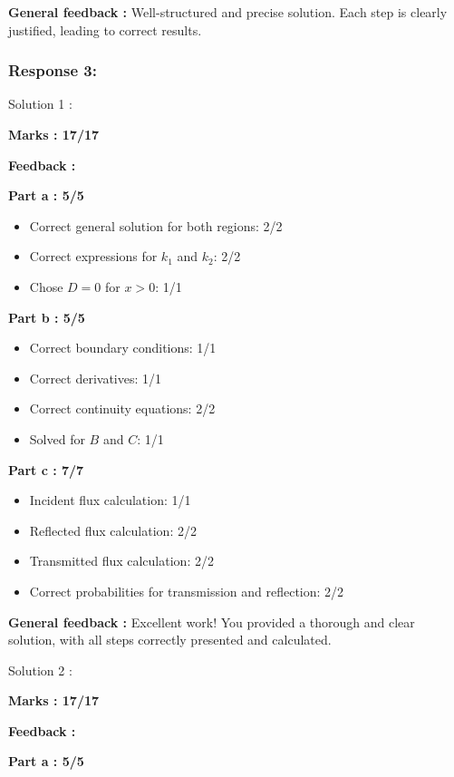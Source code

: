 \documentclass[a4paper,11pt]{article}
\begin{document}
\textbf{General feedback :}
Well-structured and precise solution. Each step is clearly justified, leading to correct results.



\subsubsection*{Response 3:}

Solution 1 :

\textbf{Marks : 17/17}

\textbf{Feedback :}

\textbf{Part a : 5/5}

\begin{itemize}
    \item Correct general solution for both regions: 2/2
    \item Correct expressions for $k_1$ and $k_2$: 2/2
    \item Chose $D = 0$ for $x > 0$: 1/1
\end{itemize}

\textbf{Part b : 5/5}

\begin{itemize}
    \item Correct boundary conditions:  1/1
    \item Correct derivatives: 1/1
    \item Correct continuity equations: 2/2
    \item Solved for $B$ and $C$: 1/1
\end{itemize}

\textbf{Part c : 7/7}

\begin{itemize}
    \item Incident flux calculation: 1/1
    \item Reflected flux calculation: 2/2
    \item Transmitted flux calculation: 2/2
    \item Correct probabilities for transmission and reflection: 2/2
\end{itemize}

\textbf{General feedback :}
Excellent work! You provided a thorough and clear solution, with all steps correctly presented and calculated.


Solution 2 :

\textbf{Marks : 17/17}

\textbf{Feedback :}

\textbf{Part a : 5/5}
\end{document}
